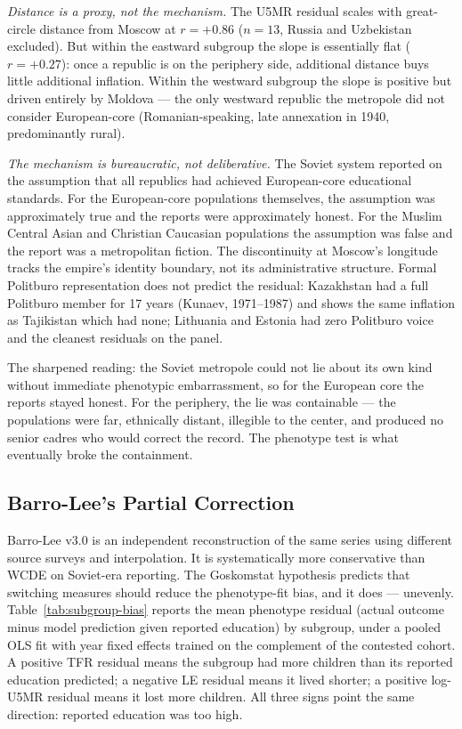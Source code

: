 \documentclass[12pt,letterpaper]{article}
\begin{document}
\textit{Distance is a proxy, not the mechanism.} The U5MR residual
scales with great-circle distance from Moscow at $r = +0.86$
($n = 13$, Russia and Uzbekistan excluded). But within the eastward
subgroup the slope is
essentially flat ($r = +0.27$): once a republic is on the periphery
side, additional distance buys little additional inflation. Within
the westward subgroup the slope is positive but driven entirely by
Moldova --- the only westward republic the metropole did not consider
European-core (Romanian-speaking, late annexation in 1940,
predominantly rural).

\textit{The mechanism is bureaucratic, not deliberative.} The Soviet
system reported on the assumption that all republics had achieved
European-core educational standards. For the European-core
populations themselves, the assumption was approximately true and the
reports were approximately honest. For the Muslim Central Asian and
Christian Caucasian populations the assumption was false and the
report was a metropolitan fiction. The discontinuity at Moscow's
longitude tracks the empire's identity boundary, not its
administrative structure. Formal Politburo representation does not
predict the residual: Kazakhstan had a full Politburo member for
17 years (Kunaev, 1971--1987) and shows the same inflation as
Tajikistan which had none; Lithuania and Estonia had zero Politburo
voice and the cleanest residuals on the panel.

The sharpened reading: the Soviet metropole could not lie about its
own kind without immediate phenotypic embarrassment, so for the
European core the reports stayed honest. For the periphery, the lie
was containable --- the populations were far, ethnically distant,
illegible to the center, and produced no senior cadres who would
correct the record. The phenotype test is what eventually broke the
containment.

\subsection{Barro-Lee's Partial Correction}\label{barro-lee-partial}

Barro-Lee v3.0 is an independent reconstruction of the same series
using different source surveys and interpolation. It is systematically
more conservative than WCDE on Soviet-era reporting. The Goskomstat
hypothesis predicts that switching measures should reduce the
phenotype-fit bias, and it does --- unevenly.
Table~\ref{tab:subgroup-bias} reports the mean phenotype residual
(actual outcome minus model prediction given reported education)
by subgroup, under a pooled OLS fit with year fixed effects trained
on the complement of the contested cohort. A positive TFR residual
means the subgroup had more children than its reported education
predicted; a negative LE residual means it lived shorter; a
positive log-U5MR residual means it lost more children. All three
signs point the same direction: reported education was too high.
\end{document}
